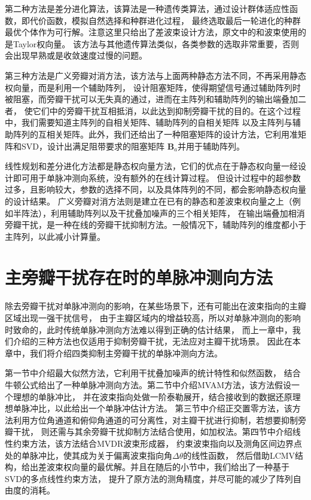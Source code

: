\documentclass[master]{thesis-uestc}
\begin{document}
第二种方法是差分进化算法，该算法是一种遗传类算法，通过设计群体适应性函数，即代价函数，模拟自然选择和种群进化过程，
最终选取最后一轮进化的种群最优个体作为可行解。注意这里只给出了差波束设计方法，原文中的和波束使用的是Taylor权向量。
该方法与其他遗传算法类似，各类参数的选取非常重要，否则会出现早熟或是收敛速度过慢的问题。

第三种方法是广义旁瓣对消方法，该方法与上面两种静态方法不同，不再采用静态权向量，而是利用一个辅助阵列，
设计阻塞矩阵，使得期望信号通过辅助阵列时被阻塞，而旁瓣干扰可以无失真的通过，进而在主阵列和辅助阵列的输出端叠加二者，
使它们中的旁瓣干扰互相抵消，以此达到抑制旁瓣干扰的目的。在这个过程中，我们需要知道主阵列的自相关矩阵、辅助阵列的自相关矩阵
以及主阵列与辅助阵列的互相关矩阵。此外，我们还给出了一种阻塞矩阵的设计方法，它利用准矩阵和SVD，设计出满足阻带要求的阻塞矩阵
$\bm{B}_a$并用于辅助阵列。

线性规划和差分进化方法都是静态权向量方法，它们的优点在于静态权向量一经设计即可用于单脉冲测向系统，没有额外的在线计算过程。
但设计过程中的超参数过多，且影响较大，参数的选择不同，以及具体阵列的不同，都会影响静态权向量的设计结果。
广义旁瓣对消方法则是建立在已有的静态和差波束权向量之上（例如半阵法），利用辅助阵列以及干扰叠加噪声的三个相关矩阵，
在输出端叠加相消旁瓣干扰，是一种在线的旁瓣干扰抑制方法。一般情况下，辅助阵列的维度都小于主阵列，以此减小计算量。

\chapter{主旁瓣干扰存在时的单脉冲测向方法}
除去旁瓣干扰对单脉冲测向的影响，在某些场景下，还有可能出在波束指向的主瓣区域出现一强干扰信号，
由于主瓣区域内的增益较高，所以对单脉冲测向的影响时致命的，此时传统单脉冲测向方法难以得到正确的估计结果，
而上一章中，我们介绍的三种方法也仅适用于抑制旁瓣干扰，无法应对主瓣干扰场景。
因此在本章中，我们将介绍四类抑制主旁瓣干扰的单脉冲测向方法。

第一节中介绍最大似然方法，它利用干扰叠加噪声的统计特性和似然函数，
结合牛顿公式给出了一种单脉冲测向方法。第二节中介绍MVAM方法，该方法假设一个理想的单脉冲比，
并在波束指向处做一阶泰勒展开，结合接收到的数据还原理想单脉冲比，以此给出一个单脉冲估计方法。
第三节中介绍正交置零方法，该方法利用方位角通道和俯仰角通道的可分离性，对主瓣干扰进行抑制，若想要抑制旁瓣干扰，
则还需与其余旁瓣干扰抑制方法结合使用，如加权法。第四节中介绍线性约束方法，该方法结合MVDR波束形成器，
约束波束指向以及测角区间边界点处的单脉冲比，使其成为关于偏离波束指向角$\Delta\theta$的线性函数，
然后借助LCMV结构，给出差波束权向量的最优解。并且在随后的小节中，我们给出了一种基于SVD的多点线性约束方法，
提升了原方法的测角精度，并尽可能的减少了阵列自由度的消耗。
\end{document}
